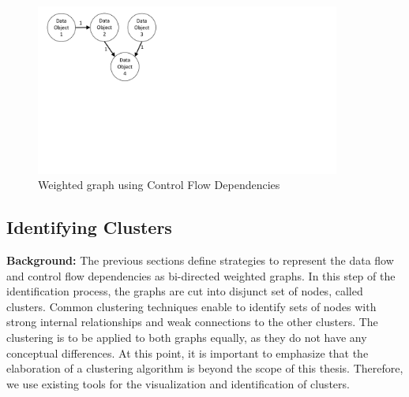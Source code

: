 \begin{figure}[h!]
	\centering
	\includegraphics[width=10cm, trim={1.5cm 9.5cm 16.0cm 0cm}]{img/DataFlowGraph.pdf}
	\caption{Weighted graph using Control Flow Dependencies}
	\label{fig:dataFlowGraph}
\end{figure}








\subsection{Identifying Clusters}
\label{sec:Solution:IdentifyCluster}
\textbf{Background:} The previous sections define strategies to represent the data flow and control flow dependencies as bi-directed weighted graphs. In this step of the identification process, the graphs are cut into disjunct set of nodes, called clusters. Common clustering techniques enable to identify sets of nodes with strong internal relationships and weak connections to the other clusters. The clustering is to be applied to both graphs equally, as they do not have any conceptual differences. At this point, it is important to emphasize that the elaboration of a clustering algorithm is beyond the scope of this thesis. Therefore, we use existing tools for the visualization and identification of clusters. \\

